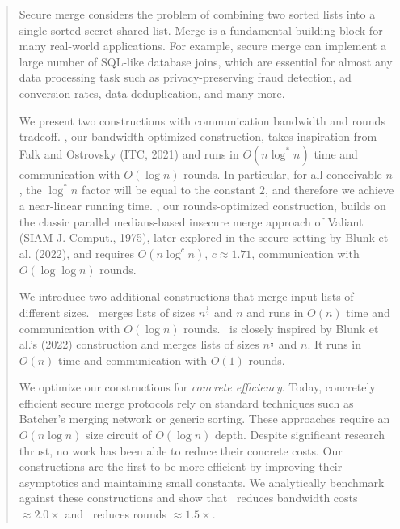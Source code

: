 \begin{abstract}

Secure merge considers the problem of combining two sorted lists into a single sorted secret-shared list. Merge is a fundamental building block for many real-world applications. For example, secure merge can implement a large number of SQL-like database joins, which are essential for almost any data processing task such as privacy-preserving fraud detection, ad conversion rates, data deduplication, and many more.


\qquad We present two constructions with communication bandwidth and rounds tradeoff. \ourapproach, our bandwidth-optimized construction, takes inspiration from Falk and Ostrovsky (ITC, 2021) and runs in  $O(n\log^*n)$ time and communication with $O(\log n)$ rounds. In particular, for all conceivable $n$, the $\log^*n$ factor will be equal to the constant $2$, and therefore we achieve a near-linear running time.
\ourapproachtwo, our rounds-optimized construction, builds on the classic parallel medians-based insecure merge approach of Valiant (SIAM J. Comput., 1975), later explored in the secure setting by Blunk et al. (2022), and requires $O(n \log^c n)$, $c \approx 1.71$, communication with $O(\log \log n)$ rounds. 

\qquad We introduce two additional constructions that merge input lists of different sizes. \sqrtmerge\ merges lists of sizes $n^{\frac{1}{2}}$ and $n$ and runs in $O(n)$ time and communication with $O(\log n)$ rounds. \knmerge\ is closely inspired by Blunk et al.'s (2022) construction and merges lists of sizes $n^{\frac{1}{3}}$ and $n$. It runs in $O(n)$ time and communication with $O(1)$ rounds.


\qquad We optimize our constructions for \emph{concrete efficiency}. Today, concretely efficient secure merge protocols rely on standard techniques such as Batcher's merging network or generic sorting. These approaches require an $O(n \log n)$ size circuit of $O(\log n)$ depth. Despite significant research thrust, no work has been able to reduce their concrete costs. Our constructions are the first to be more efficient by improving their asymptotics and maintaining small constants. We analytically benchmark against these constructions and show that \ourapproach\ reduces bandwidth costs $\approx2.0\times$ and \ourapproachtwo\ reduces rounds $\approx1.5\times$. 













\end{abstract}
